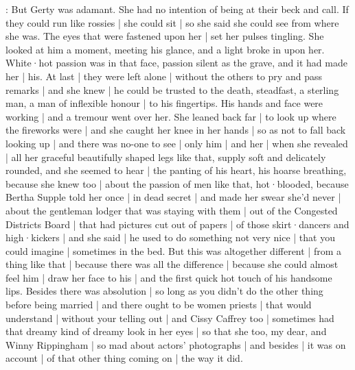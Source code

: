 :
But Gerty was adamant.
She had no intention
of being at their beck and call.
If they could run like rossies |
she could sit |
so she said she could see
from where she was.
The eyes that were fastened upon her |
set her pulses tingling.%
She looked at him a moment,
meeting his glance,
and a light broke in upon her.
White·hot passion was in that face,
passion silent as the grave,
and it had made her |
his.
At last |
they were left alone |
without the others to pry and pass remarks |
and she knew |
he could be trusted to the death,
steadfast,
a sterling man,
a man of inflexible honour |
to his fingertips.
His hands and face were working |
and a tremour went over her.
She leaned back far |
to look up
where the fireworks were |
and she caught her knee in her hands |
so as not to fall back looking up |
and there was no-one to see |
only him |
and her |
when she revealed |
all her graceful beautifully shaped legs like that,
supply soft and delicately rounded,
and she seemed to hear |
the panting of his heart,
his hoarse breathing,%
because she knew too |
about the passion of men like that,
hot·blooded,
because Bertha Supple told her once |
in dead secret |
and made her swear she'd never |
about the gentleman lodger that was staying with them |
out of the Congested Districts Board |
that had pictures cut out of papers |
of those skirt·dancers and high·kickers |
and she said |
he used to do something not very nice |
that you could imagine |
sometimes in the bed.
But this was altogether different |
from a thing like that |
because there was all the difference |
because she could almost feel him |
draw her face to his |
and the first quick hot touch
of his handsome lips.
Besides there was absolution |
so long as you didn't do the other thing before being married |
and there ought to be women priests |%
that would understand |
without your telling out |
and Cissy Caffrey too |
sometimes had that dreamy kind of dreamy look in her eyes |
so that she too,
my dear,
and Winny Rippingham |
so mad about actors' photographs |
and besides |
it was on account |
of that other thing coming on |
the way it did.

